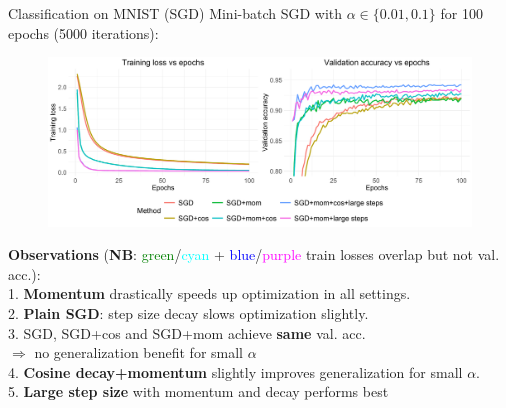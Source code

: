 \documentclass[11pt,compress,t,notes=noshow, xcolor=table]{beamer}
\begin{document}
\begin{vbframe}{Classification on MNIST (SGD)}
\vspace{-0.3cm}
Mini-batch SGD with $\alpha \in \{0.01, 0.1\}$ for 100 epochs (5000 iterations):
\begin{figure}
            \includegraphics[width=1.0\textwidth]{slides/04-multivariate-first-order/figure_man/simu_mnist/SGD_compar.pdf} \\
\end{figure}
\vspace{-0.2cm}
\textbf{Observations} 
{\footnotesize
(\textbf{NB}: \textcolor{green}{green}/\textcolor{cyan}{cyan} + \textcolor{blue}{blue}/\textcolor{magenta}{purple} train losses overlap but not val. acc.):\\ 
1. \textbf{Momentum} drastically speeds up optimization in all settings.\\
2. \textbf{Plain SGD}: step size decay slows optimization slightly. \\
3. SGD, SGD+cos and SGD+mom achieve \textbf{same} val. acc. \\
$\Rightarrow$ no generalization benefit for small $\alpha$\\
4. \textbf{Cosine decay+momentum} slightly improves generalization for small $\alpha$. \\
5. \textbf{Large step size} with momentum and decay performs best}
\end{vbframe}
\end{document}
